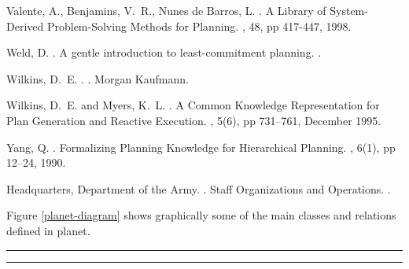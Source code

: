 \begin{thebibliography}{}
Valente, A., Benjamins, V.~R., Nunes de Barros, L.
.
\newblock A Library of System-Derived Problem-Solving Methods for Planning.
, 48, 
pp 417-447, 1998.   


Weld, D.
.
\newblock A gentle introduction to least-commitment planning.
.

Wilkins, D.~E.
.
.
\newblock Morgan Kaufmann.

Wilkins, D.~E. and Myers, K.~L.
.
\newblock A Common Knowledge Representation for Plan Generation and 
Reactive Execution. 
, 5(6), pp 731--761, 
December 1995.

Yang, Q.
.
\newblock Formalizing Planning Knowledge for Hierarchical Planning. 
, 6(1), pp 12--24, 1990.

Headquarters, Department of the Army.
.
\newblock Staff Organizations and Operations. 
.
\end{thebibliography}






Figure \ref{planet-diagram} shows graphically some of the main
classes and relations defined in {\sc planet}.

\begin{figure*}[tb]
\rule{\textwidth}{0.3mm}
\vspace{3in}
\caption{A schematic representation of a portion of the {\sc planet} ontology.}
\label{planet-diagram}
\rule{\textwidth}{0.3mm}
\end{figure*}

